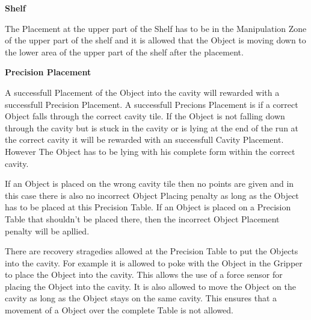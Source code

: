 \textbf{Shelf}

The Placement at the upper part of the Shelf has to be in the Manipulation Zone of the upper part of the shelf and it is allowed that the Object is moving down to the lower area of the upper part of the shelf after the placement. 


\textbf{Precision Placement}

A successfull Placement of the Object into the cavity will rewarded with a successfull Precision Placement. A successfull Precions Placement is if a  correct Object falls through the correct cavity tile. If the Object is not falling down through the cavity but is stuck in the cavity or is lying at the end of the run at the correct cavity it will be rewarded with an successfull Cavity Placement. However The Object has to be lying with his complete form within the correct cavity.

If an Object is placed on the wrong cavity tile then no points are given and in this case there is also no incorrect Object Placing penalty as long as the Object has to be placed at this Precision Table. If an Object is placed on a Precision Table that shouldn't be placed there, then the incorrect Object Placement penalty will be apllied. 

There are recovery stragedies allowed at the Precision Table to put the Objects into the cavity.
For example it is allowed to poke with the Object in the Gripper to place the Object into the cavity. This  allows the use of a force sensor for placing the Object into the cavity.
It is also allowed to move the Object on the cavity as long as the Object stays on the same cavity. This ensures that a movement of a Object over the complete Table is not allowed.

 


\newpage
%









%

%







%
